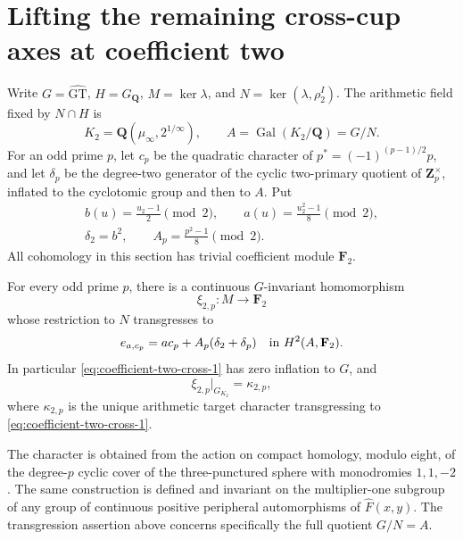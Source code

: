 \section{Lifting the remaining cross-cup axes at coefficient two}
\label{sec:coefficient-two-cross-cups}

Write \(G=\widehat{\mathrm{GT}}\), \(H=G_{\mathbf Q}\),
\(M=\ker\lambda\), and \(N=\ker(\lambda,\rho_2^I)\).
The arithmetic field fixed by \(N\cap H\) is
\[
 K_2=\mathbf Q(\mu_\infty,2^{1/\infty}),\qquad
 A=\operatorname{Gal}(K_2/\mathbf Q)=G/N.
\]
For an odd prime \(p\), let \(c_p\) be the quadratic
character of \(p^*=(-1)^{(p-1)/2}p\), and let
\(\delta_p\) be the degree-two generator of the cyclic
two-primary quotient of \(\mathbf Z_p^\times\), inflated
to the cyclotomic group and then to \(A\). Put
\[
 \begin{gathered}
 b(u)=\frac{u_2-1}{2}\pmod2,\qquad
 a(u)=\frac{u_2^2-1}{8}\pmod2,\\
 \delta_2=b^2,\qquad A_p=\frac{p^2-1}{8}\pmod2.
 \end{gathered}
\]
All cohomology in this section has trivial coefficient
module \(\mathbf F_2\).

\begin{theorem}\label{thm:coefficient-two-cross-cups}
For every odd prime \(p\), there is a continuous
\(G\)-invariant homomorphism
\[
                     \xi_{2,p}:M\longrightarrow\mathbf F_2
\]
whose restriction to \(N\) transgresses to
\begin{equation}
 e_{a,c_p}=a c_p+A_p(\delta_2+\delta_p)
                        \quad\hbox{in }H^2(A,\mathbf F_2).
                                                        \label{eq:coefficient-two-cross-1}
\end{equation}
In particular \eqref{eq:coefficient-two-cross-1} has zero inflation to \(G\), and
\begin{equation}
                       \xi_{2,p}|_{G_{K_2}}=\kappa_{2,p},
                                                        \label{eq:coefficient-two-cross-2}
\end{equation}
where \(\kappa_{2,p}\) is the unique arithmetic target
character transgressing to \eqref{eq:coefficient-two-cross-1}.

The character is obtained from the action on compact
homology, modulo eight, of the degree-\(p\) cyclic cover
of the three-punctured sphere with monodromies
\(1,1,-2\). The same construction is defined and invariant
on the multiplier-one subgroup of any group of continuous
positive peripheral automorphisms of \(\widehat F(x,y)\).
The transgression assertion above concerns specifically
the full quotient \(G/N=A\).
\end{theorem}

